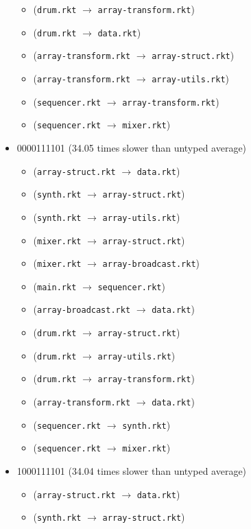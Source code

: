 \documentclass{article}
\newcommand{\mono}[1]{\texttt{#1}}
\begin{document}
\begin{itemize}
\begin{itemize}
  \item (\mono{drum.rkt} $\rightarrow$ \mono{array-transform.rkt})
  \item (\mono{drum.rkt} $\rightarrow$ \mono{data.rkt})
  \item (\mono{array-transform.rkt} $\rightarrow$ \mono{array-struct.rkt})
  \item (\mono{array-transform.rkt} $\rightarrow$ \mono{array-utils.rkt})
  \item (\mono{sequencer.rkt} $\rightarrow$ \mono{array-transform.rkt})
  \item (\mono{sequencer.rkt} $\rightarrow$ \mono{mixer.rkt})
  \end{itemize}
\item 0000111101 (34.05 times slower than untyped average)
  \begin{itemize}
  \item (\mono{array-struct.rkt} $\rightarrow$ \mono{data.rkt})
  \item (\mono{synth.rkt} $\rightarrow$ \mono{array-struct.rkt})
  \item (\mono{synth.rkt} $\rightarrow$ \mono{array-utils.rkt})
  \item (\mono{mixer.rkt} $\rightarrow$ \mono{array-struct.rkt})
  \item (\mono{mixer.rkt} $\rightarrow$ \mono{array-broadcast.rkt})
  \item (\mono{main.rkt} $\rightarrow$ \mono{sequencer.rkt})
  \item (\mono{array-broadcast.rkt} $\rightarrow$ \mono{data.rkt})
  \item (\mono{drum.rkt} $\rightarrow$ \mono{array-struct.rkt})
  \item (\mono{drum.rkt} $\rightarrow$ \mono{array-utils.rkt})
  \item (\mono{drum.rkt} $\rightarrow$ \mono{array-transform.rkt})
  \item (\mono{array-transform.rkt} $\rightarrow$ \mono{data.rkt})
  \item (\mono{sequencer.rkt} $\rightarrow$ \mono{synth.rkt})
  \item (\mono{sequencer.rkt} $\rightarrow$ \mono{mixer.rkt})
  \end{itemize}
\item 1000111101 (34.04 times slower than untyped average)
  \begin{itemize}
  \item (\mono{array-struct.rkt} $\rightarrow$ \mono{data.rkt})
  \item (\mono{synth.rkt} $\rightarrow$ \mono{array-struct.rkt})

\end{itemize}
\end{itemize}
\end{document}
